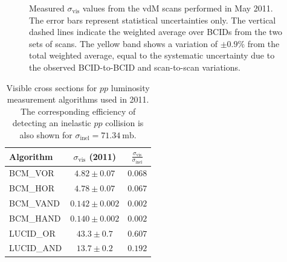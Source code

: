 \begin{figure}[htbp]
	\centering
	\caption{Measured $\sigma_{\mathrm{vis}}$ values from the vdM scans performed in May 2011. The error bars represent statistical uncertainties only. The vertical dashed lines indicate the weighted average over BCIDs from the two sets of scans. The yellow band shows a variation of $\pm0.9\%$ from the total weighted average, equal to the systematic uncertainty due to the observed BCID-to-BCID and scan-to-scan variations.}
	\label{fig:vdm-sigmavis-bcm-2011}
\end{figure}


\begin{table}[htbp]
	\centering
	\begin{tabular}{|l|c|c|}
		\hline
		Algorithm & $\sigma_{\mathrm{vis}}$ (2011) & $\frac{\sigma_{\mathrm{vis}}}{\sigma_{\mathrm{inel}}}$ \\
		\hline
		BCM\_VOR					&	$4.82\pm0.07$	&	$0.068$ \\
		\hline
		BCM\_HOR					&	$4.78\pm0.07$	&	$0.067$ \\
		\hline
		BCM\_VAND					&	$0.142\pm0.002$	&	$0.002$ \\
		\hline
		BCM\_HAND					&	$0.140\pm0.002$	&	$0.002$ \\
		\hline
		LUCID\_OR					&	$43.3\pm0.7$	&	$0.607$ \\
		\hline
		LUCID\_AND					&	$13.7\pm0.2$	&	$0.192$ \\
		\hline
	\end{tabular}
	\caption{Visible cross sections for $pp$ luminosity measurement algorithms used in 2011. The corresponding efficiency of detecting an inelastic $pp$ collision is also shown for $\sigma_{\mathrm{inel}}=\SI{71.34}{\milli\barn}$.}
	\label{table:luminosity-sigmavis-summary}
\end{table}


